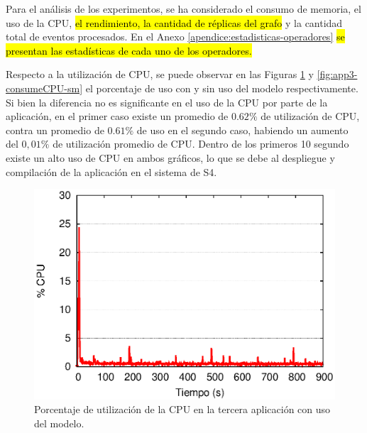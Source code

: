 Para el análisis de los experimentos, se ha considerado el consumo de memoria, el uso de la CPU, \hl{el rendimiento, la cantidad de réplicas del grafo} y la cantidad total de eventos procesados. En el Anexo \ref{apendice:estadisticas-operadores} \hl{se presentan las estadísticas de cada uno de los operadores.}


Respecto a la utilización de CPU, se puede observar en las Figuras \ref{fig:app3-consumeCPU-cm} y \ref{fig:app3-consumeCPU-sm} el porcentaje de uso con y sin uso del modelo respectivamente. Si bien la diferencia no es significante en el uso de la CPU por parte de la aplicación, en el primer caso existe un promedio de $0.62\%$ de utilización de CPU, contra un promedio de $0.61\%$ de uso en el segundo caso, habiendo un aumento del $0,01\%$ de utilización promedio de CPU. Dentro de los primeros 10 segundo existe un alto uso de CPU en ambos gráficos, lo que se debe al despliegue y compilación de la aplicación en el sistema de S4.

\begin{figure}[!ht]
\centering
    \includegraphics[scale=0.75]{images/exp/app3/cm/fisical/consumeCPU.eps}
    \caption{Porcentaje de utilización de la CPU en la tercera aplicación con uso del modelo.}
    \label{fig:app3-consumeCPU-cm}
\end{figure}

